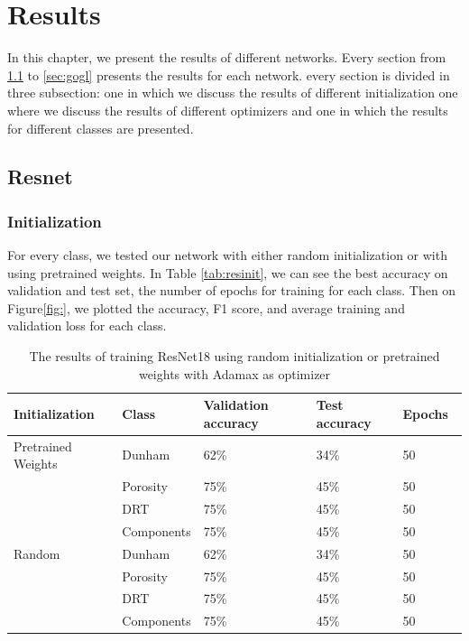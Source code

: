 \chapter{Results}\label{chp:results}

In this chapter, we present the results of different networks. Every section from \ref{sec:res} to \ref{sec:gogl} presents the results for each network. every section is divided in three subsection: one in which we discuss the results of different initialization one where we discuss the results of different optimizers and one in which the results for different classes are presented. 
\section{Resnet}\label{sec:res}
\subsection{Initialization}
For every class, we tested our network with either random initialization or with using pretrained weights. In Table \ref{tab:resinit}, we can see the best accuracy on validation and test set, the number of epochs for training for each class. Then on Figure\ref{fig:}, we plotted the accuracy, F1 score, and average training and validation loss for each class.  

\begin{table}
\caption{\label{tab:vitus-realm-user} The results of training ResNet18 using random initialization or pretrained weights with Adamax as optimizer}
\centering
\begin{tabular}[b]{| l | l | l | l | l |}
\hline
    Initialization & Class & Validation accuracy & Test accuracy & Epochs\ \\ \hline
    \multirow{}{}{Pretrained Weights} & Dunham &  62\% & 34\% & 50 \\ 
    & Porosity & 75\% & 45\% &  50 \\
    &DRT & 75\% & 45\% &  50 \\
    &Components & 75\% & 45\% &  50 \\ \hline
     \multirow{}{}{Random} & Dunham &  62\% & 34\% & 50 \\
    & Porosity & 75\% & 45\% &  50 \\
    &DRT & 75\% & 45\% &  50 \\
    &Components & 75\% & 45\% &  50 \\ \hline
    
\end{tabular} 
\end{table}

